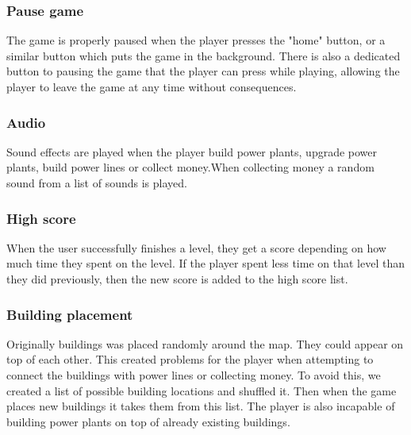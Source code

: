 	

	\subsubsection*{Pause game}

	The game is properly paused when the player presses the "home" button, or a
	similar button which puts the game in the background. There is also a
	dedicated button to pausing the game that the player can press while
	playing, allowing the player to leave the game at any time without
	consequences.

	\subsubsection*{Audio}

	Sound effects are played when the player build power plants, upgrade
	power plants, build power lines or collect money.When collecting money a
	random sound from a list of sounds is played.

	\subsubsection*{High score}

	When the user successfully finishes a level, they get a score depending on
	how much time they spent on the level. If the player spent less time on that
	level than they did previously, then the new score is added to the high score
	list.

	\subsubsection*{Building placement}

	Originally buildings was placed randomly around the map. They could appear
	on top of each other. This created problems for the player when attempting
	to connect the buildings with power lines or collecting money. To avoid
	this, we created a list of possible building locations and shuffled it. Then
	when the game places new buildings it takes them from this list. The player
	is also incapable of building power plants on top of already existing
	buildings.
	
